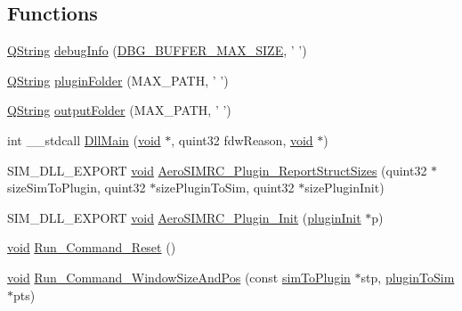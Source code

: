 \subsection*{\-Functions}
\begin{DoxyCompactItemize}
\item 
\hyperlink{group___u_a_v_objects_plugin_gab9d252f49c333c94a72f97ce3105a32d}{\-Q\-String} \hyperlink{group___aero_sim_r_c_gab7aaf0bccb3e8d4ab785a824e303a420}{debug\-Info} (\hyperlink{group___aero_sim_r_c_ga4ac56108ad3d382deff679f792d02874}{\-D\-B\-G\-\_\-\-B\-U\-F\-F\-E\-R\-\_\-\-M\-A\-X\-\_\-\-S\-I\-Z\-E}, ' ')
\item 
\hyperlink{group___u_a_v_objects_plugin_gab9d252f49c333c94a72f97ce3105a32d}{\-Q\-String} \hyperlink{group___aero_sim_r_c_ga776b2762b88960a5d487d6d6a5bc18a4}{plugin\-Folder} (\-M\-A\-X\-\_\-\-P\-A\-T\-H, ' ')
\item 
\hyperlink{group___u_a_v_objects_plugin_gab9d252f49c333c94a72f97ce3105a32d}{\-Q\-String} \hyperlink{group___aero_sim_r_c_ga3e2272a7391bd317e2e58cb38a251e4c}{output\-Folder} (\-M\-A\-X\-\_\-\-P\-A\-T\-H, ' ')
\item 
int \-\_\-\-\_\-stdcall \hyperlink{group___aero_sim_r_c_gac93a6e2f9d37b2fe831961496317bffe}{\-Dll\-Main} (\hyperlink{group___u_a_v_objects_plugin_ga444cf2ff3f0ecbe028adce838d373f5c}{void} $\ast$, quint32 fdw\-Reason, \hyperlink{group___u_a_v_objects_plugin_ga444cf2ff3f0ecbe028adce838d373f5c}{void} $\ast$)
\item 
\-S\-I\-M\-\_\-\-D\-L\-L\-\_\-\-E\-X\-P\-O\-R\-T \hyperlink{group___u_a_v_objects_plugin_ga444cf2ff3f0ecbe028adce838d373f5c}{void} \hyperlink{group___aero_sim_r_c_ga8ef52f40ca9cf8fb9a0c10021b420e4d}{\-Aero\-S\-I\-M\-R\-C\-\_\-\-Plugin\-\_\-\-Report\-Struct\-Sizes} (quint32 $\ast$size\-Sim\-To\-Plugin, quint32 $\ast$size\-Plugin\-To\-Sim, quint32 $\ast$size\-Plugin\-Init)
\item 
\-S\-I\-M\-\_\-\-D\-L\-L\-\_\-\-E\-X\-P\-O\-R\-T \hyperlink{group___u_a_v_objects_plugin_ga444cf2ff3f0ecbe028adce838d373f5c}{void} \hyperlink{group___aero_sim_r_c_ga98e72d84a109612a93351aed8683c42f}{\-Aero\-S\-I\-M\-R\-C\-\_\-\-Plugin\-\_\-\-Init} (\hyperlink{structplugin_init}{plugin\-Init} $\ast$p)
\item 
\hyperlink{group___u_a_v_objects_plugin_ga444cf2ff3f0ecbe028adce838d373f5c}{void} \hyperlink{group___aero_sim_r_c_gacd4d7dbcd8b4676d00471827b255b7ff}{\-Run\-\_\-\-Command\-\_\-\-Reset} ()
\item 
\hyperlink{group___u_a_v_objects_plugin_ga444cf2ff3f0ecbe028adce838d373f5c}{void} \hyperlink{group___aero_sim_r_c_ga80a7533068c803af865f6e2af76e050d}{\-Run\-\_\-\-Command\-\_\-\-Window\-Size\-And\-Pos} (const \hyperlink{structsim_to_plugin}{sim\-To\-Plugin} $\ast$stp, \hyperlink{structplugin_to_sim}{plugin\-To\-Sim} $\ast$pts)

\end{DoxyCompactItemize}
